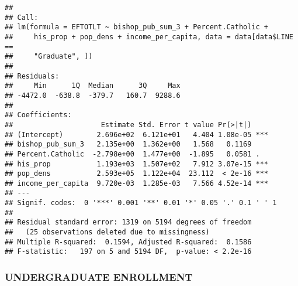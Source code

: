 \documentclass[]{article}
\newenvironment{Shaded}{\begin{snugshade}}{\end{snugshade}}
\newcommand{\KeywordTok}[1]{\textcolor[rgb]{0.13,0.29,0.53}{\textbf{#1}}}
\newcommand{\DataTypeTok}[1]{\textcolor[rgb]{0.13,0.29,0.53}{#1}}
\newcommand{\DecValTok}[1]{\textcolor[rgb]{0.00,0.00,0.81}{#1}}
\newcommand{\StringTok}[1]{\textcolor[rgb]{0.31,0.60,0.02}{#1}}
\newcommand{\OperatorTok}[1]{\textcolor[rgb]{0.81,0.36,0.00}{\textbf{#1}}}
\newcommand{\NormalTok}[1]{#1}
\begin{document}
\begin{verbatim}
## 
## Call:
## lm(formula = EFTOTLT ~ bishop_pub_sum_3 + Percent.Catholic + 
##     his_prop + pop_dens + income_per_capita, data = data[data$LINE == 
##     "Graduate", ])
## 
## Residuals:
##     Min      1Q  Median      3Q     Max 
## -4472.0  -638.8  -379.7   160.7  9288.6 
## 
## Coefficients:
##                     Estimate Std. Error t value Pr(>|t|)    
## (Intercept)        2.696e+02  6.121e+01   4.404 1.08e-05 ***
## bishop_pub_sum_3   2.135e+00  1.362e+00   1.568   0.1169    
## Percent.Catholic  -2.798e+00  1.477e+00  -1.895   0.0581 .  
## his_prop           1.193e+03  1.507e+02   7.912 3.07e-15 ***
## pop_dens           2.593e+05  1.122e+04  23.112  < 2e-16 ***
## income_per_capita  9.720e-03  1.285e-03   7.566 4.52e-14 ***
## ---
## Signif. codes:  0 '***' 0.001 '**' 0.01 '*' 0.05 '.' 0.1 ' ' 1
## 
## Residual standard error: 1319 on 5194 degrees of freedom
##   (25 observations deleted due to missingness)
## Multiple R-squared:  0.1594, Adjusted R-squared:  0.1586 
## F-statistic:   197 on 5 and 5194 DF,  p-value: < 2.2e-16
\end{verbatim}

\subsubsection{UNDERGRADUATE ENROLLMENT}\label{undergraduate-enrollment}

\begin{Shaded}
\end{Shaded}
\end{document}
